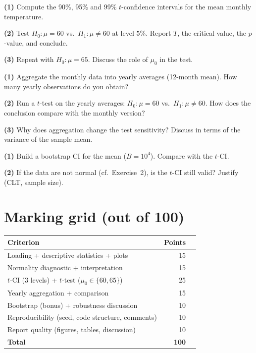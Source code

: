 \documentclass[a4paper,11pt]{article}
\begin{document}
\begin{exercise}
\textbf{(1)} Compute the 90\%, 95\% and 99\% $t$-confidence intervals
for the mean monthly temperature.

\textbf{(2)} Test $H_0 : \mu = 60$ vs.\ $H_1 : \mu \neq 60$ at level
$5\%$. Report $T$, the critical value, the $p$-value, and conclude.

\textbf{(3)} Repeat with $H_0 : \mu = 65$. Discuss the role of $\mu_0$
in the test.
\end{exercise}

\begin{exercise}
\textbf{(1)} Aggregate the monthly data into yearly averages (12-month
mean). How many yearly observations do you obtain?

\textbf{(2)} Run a $t$-test on the yearly averages: $H_0 : \mu = 60$
vs.\ $H_1 : \mu \neq 60$. How does the conclusion compare with the
monthly version?

\textbf{(3)} Why does aggregation change the test sensitivity?
Discuss in terms of the variance of the sample mean.
\end{exercise}

\begin{exercise}
\textbf{(1)} Build a bootstrap CI for the mean ($B = 10^4$). Compare
with the $t$-CI.

\textbf{(2)} If the data are not normal (cf.\ Exercise~2), is the
$t$-CI still valid? Justify (CLT, sample size).
\end{exercise}

\section*{Marking grid (out of 100)}

\begin{center}
\begin{tabular}{p{8cm}rl}
\toprule
\textbf{Criterion} & \textbf{Points} & \\
\midrule
Loading + descriptive statistics + plots               & 15 \\
Normality diagnostic + interpretation                  & 15 \\
$t$-CI (3 levels) + $t$-test ($\mu_0 \in \{60, 65\}$)  & 25 \\
Yearly aggregation + comparison                        & 15 \\
Bootstrap (bonus) + robustness discussion              & 10 \\
Reproducibility (seed, code structure, comments)       & 10 \\
Report quality (figures, tables, discussion)           & 10 \\
\midrule
\textbf{Total}                                         & \textbf{100} \\
\bottomrule
\end{tabular}
\end{center}

\bigskip
\hfill\auteurNom\par
\hfill\auteurEmail\par
\end{document}
